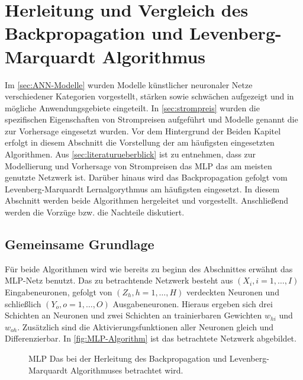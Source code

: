 


\section{Herleitung und Vergleich des Backpropagation und Levenberg-Marquardt Algorithmus}\label{sec:algorithm}

Im \autoref{sec:ANN-Modelle} wurden Modelle künstlicher neuronaler Netze verschiedener Kategorien vorgestellt, stärken sowie schwächen aufgezeigt und in mögliche Anwendungsgebiete eingeteilt. In \autoref{sec:strompreis} wurden die spezifischen Eigenschaften von Strompreisen aufgeführt und Modelle genannt die zur Vorhersage eingesetzt wurden. Vor dem Hintergrund der Beiden Kapitel erfolgt in diesem Abschnitt die Vorstellung der am häufigsten eingesetzten Algorithmen. Aus \autoref{sec:literaturueberblick} ist zu entnehmen, dass zur Modellierung und Vorhersage von Strompreisen das MLP das am meisten genutzte Netzwerk ist. Darüber hinaus wird das Backpropagation gefolgt vom Levenberg-Marquardt Lernalgorythmus am häufigsten eingesetzt. In diesem Abschnitt werden beide Algorithmen hergeleitet und vorgestellt. Anschließend werden die Vorzüge bzw. die Nachteile diskutiert. 

\subsection{Gemeinsame Grundlage}
Für beide Algorithmen wird wie bereits zu beginn des Abschnittes erwähnt das MLP-Netz benutzt. Das zu betrachtende Netzwerk besteht aus $(X_{i}, i=1,\dots,I)$ Eingabeneuronen, gefolgt von $(Z_{h}, h=1,\dots,H)$ verdeckten Neuronen und schließlich $(Y_{o}, o=1,\dots,O)$ Ausgabeneuronen. Hieraus ergeben sich drei Schichten an Neuronen und zwei Schichten an trainierbaren Gewichten $w_{hi}$ und $w_{oh}$. Zusätzlich sind die Aktivierungsfunktionen aller Neuronen gleich und Differenzierbar. In \autoref{fig:MLP-Algorithm} ist das betrachtete Netzwerk abgebildet.

\begin{figure}[!htb]
    \centering
        
    \caption{MLP Das bei der Herleitung des Backpropagation und Levenberg-Marquardt Algorithmuses betrachtet wird.}
    \label{fig:MLP-Algorithm}
\end{figure}


